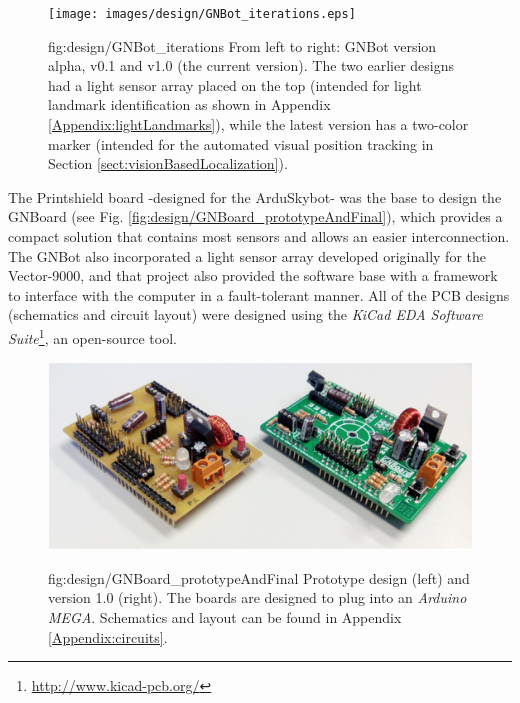 \begin{figure}[h!]
\centerline{\mbox{\texttt{[image: images/design/GNBot\_iterations.eps]}}}
{fig:design/GNBot_iterations}{
From left to right: GNBot version alpha, v0.1 and v1.0 (the current version).
The two earlier designs had a light sensor array placed on the top (intended for light landmark identification as shown in Appendix \ref{Appendix:lightLandmarks}), while the latest version has a two-color marker (intended for the automated visual position tracking in Section \ref{sect:visionBasedLocalization}). %
}\end{figure}

\vspace{-1cm}



\label{sect:openSourceElectronics}


The Printshield board -designed for the ArduSkybot- was the base to design the GNBoard (see Fig. \ref{fig:design/GNBoard_prototypeAndFinal}), which provides a compact solution that contains most sensors and allows an easier interconnection. The GNBot also incorporated a light sensor array developed originally for the Vector-9000, and that project also provided the software base with a framework to interface with the computer in a fault-tolerant manner. All of the PCB designs (schematics and circuit layout) were designed using the \emph{KiCad EDA Software Suite}\footnote{\url{http://www.kicad-pcb.org/}}, an open-source tool.




\begin{figure}[h!]
\centerline{\mbox{\includegraphics[width=15cm]{images/design/GNBoard_prototypeAndFinal.eps}}}
{fig:design/GNBoard_prototypeAndFinal}{
Prototype design (left) and version 1.0 (right).
The boards are designed to plug into an \emph{Arduino MEGA}.
Schematics and layout can be found in Appendix \ref{Appendix:circuits}.
}\end{figure}






